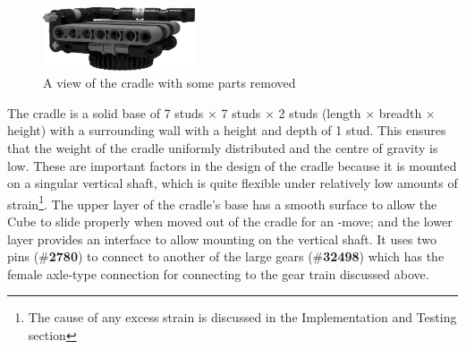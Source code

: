 \documentclass{report}
\newcommand{\tbo}[1]{\textbf{#1}}
\newcommand{\legopiece}[1]{(\#\tbo{#1})}
\newcommand{\move}[1]{\uppercase{\texttt{\formatmovesnospace{#1}}}-move}
\begin{document}
	\begin{figure}[H]
		\begin{center}
			\includegraphics[width=0.4\textwidth]{Resources/Images/rdrCradle.png}
			\caption{A view of the cradle with some parts removed}
			\label{fig:rdrCradle}
		\end{center}
	\end{figure}
	
	The cradle is a solid base of 7 studs $\times$ 7 studs $\times$ 2 studs (length $\times$ breadth $\times$ height) with a surrounding wall with a height and depth of 1 stud. This ensures that the weight of the cradle uniformly distributed and the centre of gravity is low. These are important factors in the design of the cradle because it is mounted on a singular vertical shaft, which is quite flexible under relatively low amounts of strain\footnote{The cause of any excess strain is discussed in the Implementation and Testing section}. The upper layer of the cradle's base has a smooth surface to allow the Cube to slide properly when moved out of the cradle for an \move{x}; and the lower layer provides an interface to allow mounting on the vertical shaft. It uses two pins \legopiece{2780} to connect to another of the large gears \legopiece{32498} which has the female axle-type connection for connecting to the gear train discussed above.
	
\end{document}
